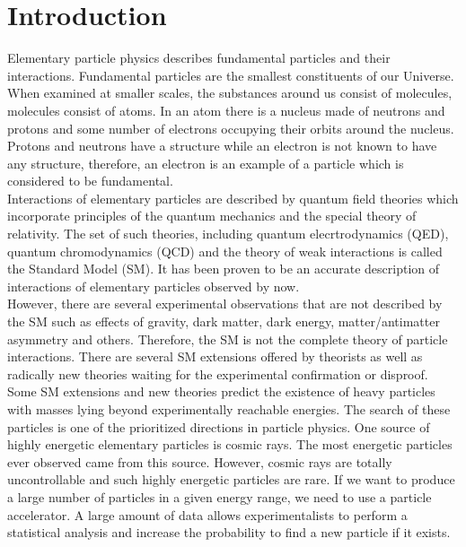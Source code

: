 \section{Introduction}
\label{sec:intro}

Elementary particle physics describes fundamental particles and their interactions. Fundamental particles are the smallest constituents of our Universe. When examined at smaller scales, the substances around us consist of molecules, molecules consist of atoms. In an atom there is a nucleus made of neutrons and protons and some number of electrons occupying their orbits around the nucleus. Protons and neutrons have a structure while an electron is not known to have any structure, therefore, an electron is an example of a particle which is considered to be fundamental.\\

Interactions of elementary particles are described by quantum field theories which incorporate principles of the quantum mechanics and the special theory of relativity. The set of such theories, including quantum elecrtrodynamics (QED), quantum chromodynamics (QCD) and the theory of weak interactions is called the Standard Model (SM). It has been proven to be an accurate description of interactions of elementary particles observed by now.\\ 

However, there are several experimental observations that are not described by the SM such as effects of gravity, dark matter, dark energy, matter/antimatter asymmetry and others. Therefore, the SM is not the complete theory of particle interactions. There are several SM extensions offered by theorists as well as radically new theories waiting for the experimental confirmation or disproof. \\

Some SM extensions and new theories predict the existence of heavy particles with masses lying beyond experimentally reachable energies. The search of these particles is one of the prioritized directions in particle physics. One source of highly energetic elementary particles is cosmic rays. The most energetic particles ever observed came from this source. However, cosmic rays are totally uncontrollable and such highly energetic particles are rare. If we want to produce a large number of particles in a given energy range, we need to use a particle accelerator. A large amount of data allows experimentalists to perform a statistical analysis and increase the probability to find a new particle if it exists.\\

